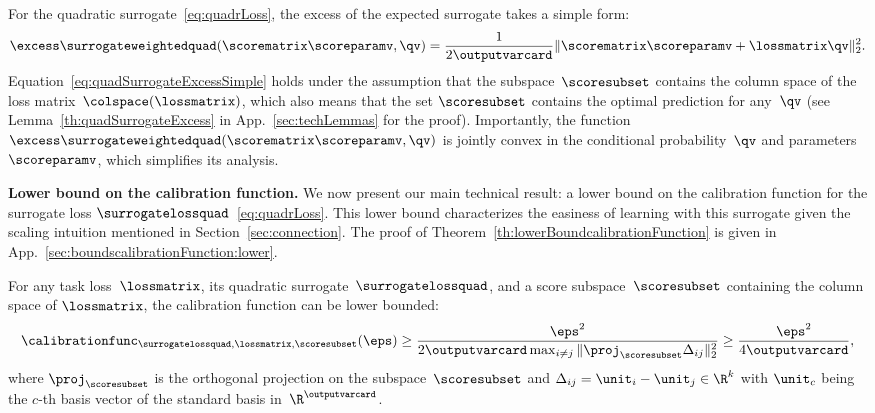 \documentclass{article}
\begin{document}
For the quadratic surrogate~\eqref{eq:quadrLoss}, the excess of the expected surrogate takes a simple form:
\begin{equation}
\label{eq:quadSurrogateExcessSimple}
\excess\surrogateweightedquad(\scorematrix\scoreparamv, \qv) = \frac{1}{2\outputvarcard}\| \scorematrix\scoreparamv + \lossmatrix \qv \|_2^2.
\end{equation}
%
Equation~\eqref{eq:quadSurrogateExcessSimple} holds under the assumption that the subspace~$\scoresubset$ contains the column space of the loss matrix~$\colspace(\lossmatrix)$, which also means that the set $\scoresubset$ contains the optimal prediction for any~$\qv$ (see Lemma~\ref{th:quadSurrogateExcess} in App.~\ref{sec:techLemmas} for the proof).
Importantly, the function~$\excess\surrogateweightedquad(\scorematrix\scoreparamv, \qv)$ is jointly convex in the conditional probability~$\qv$ and parameters~$\scoreparamv$, which simplifies its analysis.


%
%
\textbf{Lower bound on the calibration function.}
We now present our main technical result: a lower bound on the calibration function for the surrogate loss $\surrogatelossquad$~\eqref{eq:quadrLoss}. This lower bound characterizes the easiness of learning with this surrogate given the scaling intuition mentioned in Section~\ref{sec:connection}.
The proof of Theorem~\ref{th:lowerBoundcalibrationFunction} is given in App.~\ref{sec:boundscalibrationFunction:lower}.

%
%
%

%
%
%

\begin{theorem}
    \label{th:lowerBoundcalibrationFunction}
    For any task loss~$\lossmatrix$, its quadratic surrogate~$\surrogatelossquad$, and a score subspace~$\scoresubset$ containing the column space of $\lossmatrix$, the calibration function can be lower bounded:
    \begin{equation}
    \label{eq:lowerBoundcalibrationFunction}
    \calibrationfunc_{\surrogatelossquad,\lossmatrix,\scoresubset}(\eps)
    \geq
    \frac{\eps^2}{2\outputvarcard \max_{i\neq j}\|\proj_{\scoresubset} \Delta_{ij}\|_2^2}
    \geq 
    \frac{\eps^2}{4\outputvarcard},
    \end{equation}
    where $\proj_{\scoresubset}$ is the orthogonal projection on the subspace~$\scoresubset$ and $\Delta_{ij} = \unit_i - \unit_j \in \R^k$ with $\unit_c$ being the $c$-th basis vector of the standard basis in~$\R^\outputvarcard$.
\end{theorem}
\end{document}
